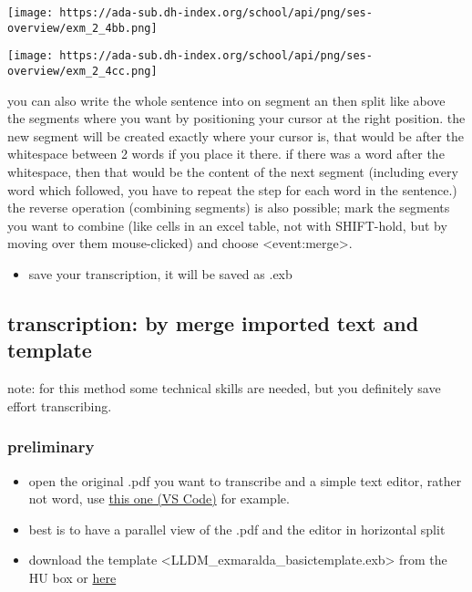 \documentclass[
  12pt,
]{article}
\providecommand{\tightlist}{%
  \setlength{\itemsep}{0pt}\setlength{\parskip}{0pt}}
\begin{document}
\texttt{[image: https://ada-sub.dh-index.org/school/api/png/ses-overview/exm\_2\_4bb.png]}

\texttt{[image: https://ada-sub.dh-index.org/school/api/png/ses-overview/exm\_2\_4cc.png]}

you can also write the whole sentence into on segment an then split like
above the segments where you want by positioning your cursor at the
right position. the new segment will be created exactly where your
cursor is, that would be after the whitespace between 2 words if you
place it there. if there was a word after the whitespace, then that
would be the content of the next segment (including every word which
followed, you have to repeat the step for each word in the sentence.)\\
the reverse operation (combining segments) is also possible; mark the
segments you want to combine (like cells in an excel table, not with
SHIFT-hold, but by moving over them mouse-clicked) and choose
\textless event:merge\textgreater.

\begin{itemize}
\tightlist
\item
  save your transcription, it will be saved as .exb
\end{itemize}

\hypertarget{transcription-by-merge-imported-text-and-template}{%
\subsection{transcription: by merge imported text and
template}\label{transcription-by-merge-imported-text-and-template}}

note: for this method some technical skills are needed, but you
definitely save effort transcribing.

\hypertarget{preliminary-1}{%
\subsubsection{preliminary}\label{preliminary-1}}

\begin{itemize}
\tightlist
\item
  open the original .pdf you want to transcribe and a simple text
  editor, rather not word, use \href{https://code.visualstudio.com}{this
  one (VS Code)} for example.
\item
  best is to have a parallel view of the .pdf and the editor in
  horizontal split
\item
  download the template
  \textless LLDM\_exmaralda\_basictemplate.exb\textgreater{} from the HU
  box or
  \href{https://github.com/esteeschwarz/HU-LX/blob/main/trans/LLDM_exmaralda_basictemplate.exb}{here}
\end{itemize}
\end{document}
